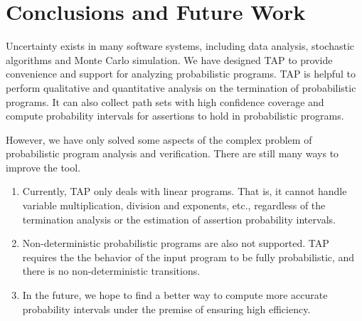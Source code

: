 \documentclass[sigconf,review, anonymous]{acmart}
\begin{document}
\section{Conclusions and Future Work}
Uncertainty exists in many software systems, including data analysis, stochastic algorithms and Monte Carlo simulation. We have designed TAP  to provide convenience and support for analyzing probabilistic programs.
TAP is helpful to perform qualitative and quantitative analysis on the termination of probabilistic programs. It can also collect path sets with high confidence coverage and compute  probability intervals for assertions to hold in probabilistic programs.


However, we have only solved some aspects of the complex problem of probabilistic program analysis and verification. There are still many ways to improve the tool.
\begin{enumerate}
	\item Currently, TAP only deals with linear programs. That is, it cannot handle variable multiplication, division and exponents, etc., regardless of the termination analysis or the estimation of assertion probability intervals.
	\item Non-deterministic probabilistic programs  are also not supported. TAP requires the the behavior of the input program to be fully probabilistic, and there is no non-deterministic transitions. 
	\item In the future, we hope to find a better way to compute more accurate probability intervals under the premise of ensuring high efficiency. 
\end{enumerate}




\end{document}

